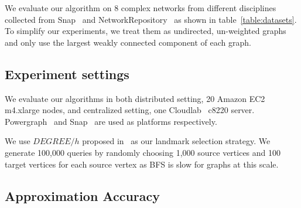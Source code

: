 We evaluate our algorithm on 8 complex networks from different disciplines collected from Snap~\cite{snapnets} and NetworkRepository~\cite{nr} as shown in table~\ref{table:datasets}. 
To simplify our experiments, we treat them as undirected, un-weighted graphs and only use the largest weakly connected component of each graph. 

\subsection{Experiment settings}
\label{eval_system}

We evaluate our algorithms in both distributed setting, 20 Amazon EC2 m4.xlarge nodes, and centralized setting, one Cloudlab~\cite{RicciEide:login14} c8220 server. 
Powergraph~\cite{180251} and Snap~\cite{snapnets} are used as platforms respectively. 


We use $DEGREE/h$ proposed in~\cite{Potamias:2009:FSP:1645953.1646063} as our landmark selection strategy. We generate 100,000 queries by randomly choosing 1,000 source vertices and 100 target vertices for each source vertex as BFS is slow for graphs at this scale. 

\subsection{Approximation Accuracy}
\label{eval_accuracy}

